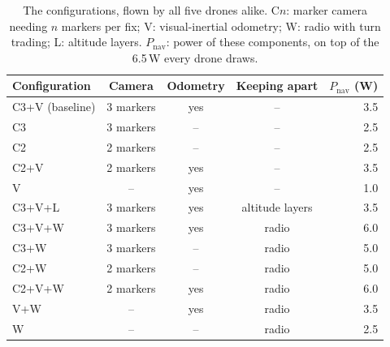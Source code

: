 \begin{table}[t]
\caption{The configurations, flown by all five drones alike. C$n$: marker camera needing $n$ markers per fix; V: visual-inertial odometry; W: radio with turn trading; L: altitude layers. $P_\mathrm{nav}$: power of these components, on top of the 6.5\,W every drone draws.}
\label{tab:configs}
\centering\footnotesize
\setlength{\tabcolsep}{4pt}
\begin{tabular}{@{}lcccr@{}}
\toprule
Configuration & Camera & Odometry & Keeping apart & $P_\mathrm{nav}$ (W)\\
\midrule
C3+V (baseline) & 3 markers & yes & -- & 3.5\\
C3 & 3 markers & -- & -- & 2.5\\
C2 & 2 markers & -- & -- & 2.5\\
C2+V & 2 markers & yes & -- & 3.5\\
V & -- & yes & -- & 1.0\\
C3+V+L & 3 markers & yes & altitude layers & 3.5\\
C3+V+W & 3 markers & yes & radio & 6.0\\
C3+W & 3 markers & -- & radio & 5.0\\
C2+W & 2 markers & -- & radio & 5.0\\
C2+V+W & 2 markers & yes & radio & 6.0\\
V+W & -- & yes & radio & 3.5\\
W & -- & -- & radio & 2.5\\
\bottomrule
\end{tabular}
\end{table}
